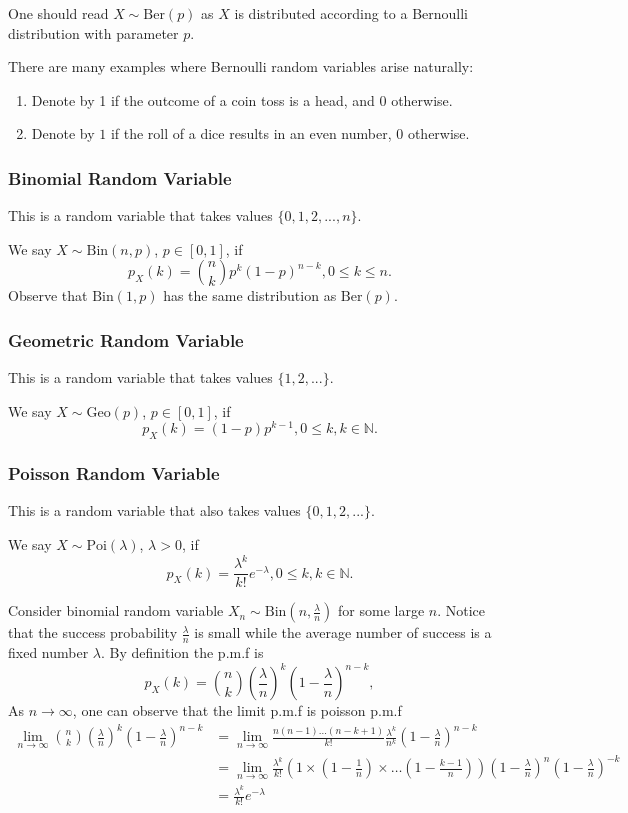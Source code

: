 One should read $X \sim \textrm{Ber}(p)$ as $X$ is distributed according to a Bernoulli distribution with parameter $p$.

There are many examples where Bernoulli random variables arise naturally:
\begin{enumerate}
    \item Denote by 1 if the outcome of a coin toss is a head, and $0$ otherwise.
    \item Denote by $1$ if the roll of a dice results in an even number, $0$ otherwise.
\end{enumerate}

\subsubsection{Binomial Random Variable} This is a random variable that takes  values $\{0,1,2,...,n\}$.

We say $X \sim \textrm{Bin}(n,p)$, $p \in [0,1]$, if
$$ p_X(k)= \binom{n}{k}p^k(1-p)^{n-k},  0\leq k \leq n. $$
Observe that $\textrm{Bin}(1,p)$ has the same distribution as $\textrm{Ber}(p)$.

\subsubsection{Geometric Random Variable} This is a random variable that takes  values $\{1,2,...\}$.

We say $X \sim \textrm{Geo}(p)$, $p \in [0,1]$, if
$$ p_X(k)= (1-p) p^{k-1},  0\leq k, k \in \mathbb{N}. $$

\subsubsection{Poisson Random Variable} This is a random variable that also takes  values $\{0,1,2,...\}$.

We say $X \sim \textrm{Poi}(\lambda)$, $\lambda > 0$, if
$$ p_X(k)=  \frac{\lambda^{k}}{k!}e^{-\lambda},  0\leq k, k \in \mathbb{N}. $$

Consider binomial random variable $X_n \sim \textrm{Bin}(n, \frac{\lambda}{n})$ for some large $n$. Notice that the success probability $\frac{\lambda}{n}$ is small while the average number of success is a fixed number $\lambda$. By definition the p.m.f is
$$ p_X(k)= \binom{n}{k}\left( \frac{\lambda}{n}\right) ^k(1-\frac{\lambda}{n})^{n-k},$$
As $n\to \infty$, one can observe that the limit p.m.f is poisson p.m.f
\begin{align*}
\lim_{n\to \infty} \binom{n}{k}\left( \frac{\lambda}{n}\right) ^k(1-\frac{\lambda}{n})^{n-k} &= \lim_{n\to \infty}\frac{n(n-1) \ldots (n-k+1)}{k!}\frac{\lambda ^k}{n^k} (1-\frac{\lambda}{n})^{n-k}\\
&= \lim_{n\to \infty} \frac{\lambda^k}{k!} \left( 1\times (1-\frac{1}{n}) \times \ldots (1- \frac{k-1}{n})\right) (1-\frac{\lambda}{n})^{n} (1-\frac{\lambda}{n})^{-k}\\
&= \frac{\lambda^{k}}{k!}e^{-\lambda}
\end{align*}



